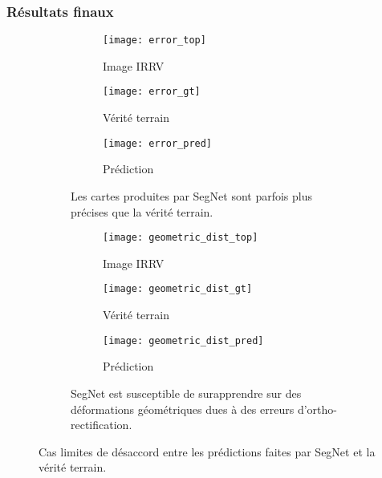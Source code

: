 \subsubsection{Résultats finaux}

\begin{figure}[t]
	\captionsetup[subfigure]{singlelinecheck=off,justification=centering}
	\begin{subfigure}{0.5\textwidth}
		\begin{subfigure}[t]{0.3\textwidth}
	    	\texttt{[image: error\_top]}
	        \caption*{Image \gls{IRRV}}
	    \end{subfigure}
	    \begin{subfigure}[t]{0.3\textwidth}
	    	\texttt{[image: error\_gt]}
	        \caption*{Vérité terrain}
	    \end{subfigure}
	    \begin{subfigure}[t]{0.3\textwidth}
	    	\texttt{[image: error\_pred]}
	        \caption*{Prédiction}
	    \end{subfigure}
	    \caption{Les cartes produites par SegNet sont parfois plus précises que la vérité terrain.}
	    \label{fig:unprecise_transition}
	\end{subfigure}
	\begin{subfigure}{0.5\textwidth}
		\begin{subfigure}[t]{0.3\textwidth}
	    	\texttt{[image: geometric\_dist\_top]}
	        \caption*{Image \gls{IRRV}}
	    \end{subfigure}
	    \begin{subfigure}[t]{0.3\textwidth}
	    	\texttt{[image: geometric\_dist\_gt]}
	        \caption*{Vérité terrain}
	    \end{subfigure}
	    \begin{subfigure}[t]{0.3\textwidth}
	    	\texttt{[image: geometric\_dist\_pred]}
	        \caption*{Prédiction}
	    \end{subfigure}
	    \caption{SegNet est susceptible de surapprendre sur des déformations géométriques dues à des erreurs d'ortho-rectification.}
	    \label{fig:geometric_dist}
	\end{subfigure}
	\caption{Cas limites de désaccord entre les prédictions faites par SegNet et la vérité terrain.\\
	\isprslegende}
\end{figure}

